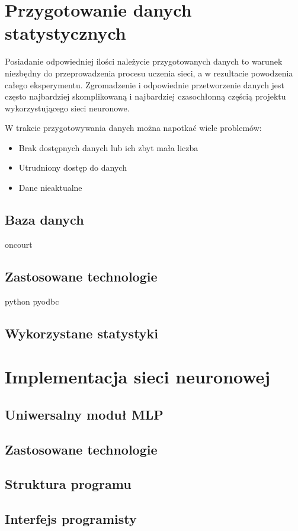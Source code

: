 \chapter{Przygotowanie danych statystycznych}
Posiadanie odpowiedniej ilości należycie przygotowanych danych to warunek niezbędny do przeprowadzenia procesu uczenia sieci, a w rezultacie powodzenia całego eksperymentu. Zgromadzenie i odpowiednie przetworzenie danych jest często najbardziej skomplikowaną i najbardziej czasochłonną częścią projektu wykorzystującego sieci neuronowe. 

W trakcie przygotowywania danych można napotkać wiele problemów:
\begin{itemize}
\item Brak dostępnych danych lub ich zbyt mała liczba
\item Utrudniony dostęp do danych
\item Dane nieaktualne

\end{itemize}

\section{Baza danych}
oncourt
\section{Zastosowane technologie}
python
pyodbc
\section{Wykorzystane statystyki}

\chapter{Implementacja sieci neuronowej}
\section{Uniwersalny moduł MLP}
\section{Zastosowane technologie}
\section{Struktura programu}
\section{Interfejs programisty}

